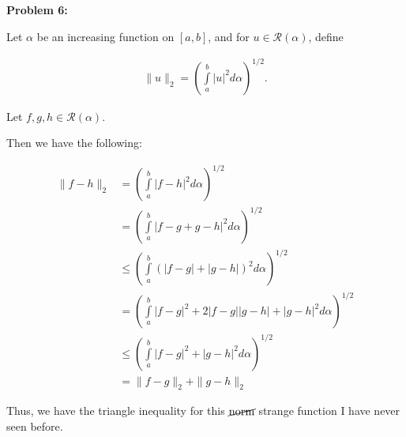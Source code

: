 \documentclass[a4paper,12pt]{article}
\newcommand{\shunt}{\vspace{20mm}}
\newcommand{\absval}[1]{\lvert #1 \rvert}
\newcommand{\norm}[1]{\|#1\|}
\newcommand{\al}{\alpha} %
\newcommand{\scrR}{\mathcal{R}}
\begin{document}

\shunt

{\bf Problem 6:}

Let $\al$ be an increasing function on $[a,b]$, and for $u \in \scrR (\al)$, define

\begin{align*}
\norm{u}_2 = \left(\int\limits_a^b \absval{u}^2 d\al \right)^{1/2}.
\end{align*}

Let $f,g,h \in \scrR(\al)$.

Then we have the following:

\begin{align*}
\norm{f-h}_2 &= \left(\int\limits_a^b \absval{f-h}^2 d\al \right)^{1/2}\\
&= \left(\int\limits_a^b \absval{f-g+g-h}^2 d\al \right)^{1/2}\\
&\leq \left(\int\limits_a^b (\absval{f-g} + \absval{g-h})^2 d\al \right)^{1/2}\\
&= \left(\int\limits_a^b \absval{f-g}^2 + 2\absval{f-g}\absval{g-h} + \absval{g-h}^2 d\al \right)^{1/2}\\
&\leq \left(\int\limits_a^b \absval{f-g}^2 + \absval{g-h}^2 d\al \right)^{1/2}\\
&= \norm{f-g}_2 + \norm{g-h}_2
\end{align*}

Thus, we have the triangle inequality for this $\cancel{\text{norm}}$ strange function I have never seen before.

\shunt
\end{document}
